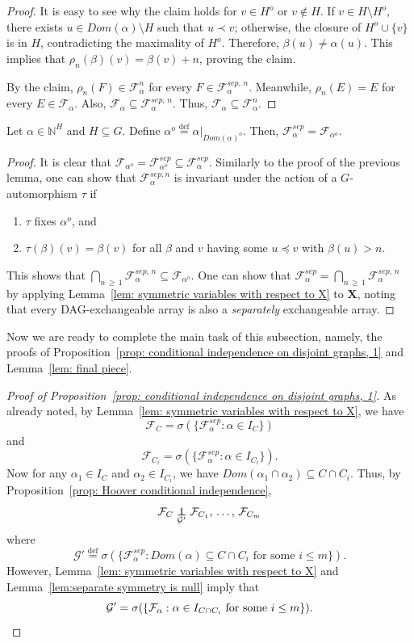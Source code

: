\documentclass[AHL,Unicode,longabstracts,published]{cedram}
\newcommand{\independent}{\protect\mathpalette{\protect\independenT}{\perp}}\def\independenT#1#2{\mathrel{\rlap{$#1#2$}\mkern2mu{#1#2}}}
\newcommand{\alf}{\alpha}%
\newcommand*\bb{\beta}
\newcommand*{\defeq}{\stackrel{\mathrm{def}}{=}}
\newcommand*{\sep}{\mathit{sep}}
\newcommand*\dom{\mathit{Dom}}
\newcommand*\N{\mathbb{N}}
\newcommand*\FF{\mathcal{F}}
\newcommand*\GG{\mathcal{G}}
\newcommand*\bX{\mathbf{X}}
\newcommand*\N{\mathbb{N}}
\begin{document}
\begin{proof}
It is easy to see why the claim holds for $v \in H^o$ or $v \notin H$. If $v \in H \setminus H^o$, there exists $u \in \dom(\alf)\setminus H$ such that $u \prec v$; otherwise, the closure of $H^o \cup \{v\}$ is in $H$, contradicting the maximality of $H^o$. Therefore, $\bb(u) \neq \alf(u)$. This implies that $\rho_n(\bb)(v)=\bb(v)+n$, proving the claim.

By the claim, $\rho_n (F) \in \FF_\alf^n$ for every $F \in \mathcal{F}_\alf^{\sep,\,n}$. Meanwhile, $\rho_n(E)=E$ for every $E \in \FF_\alf $. Also, $\FF_\alf \subseteq \mathcal{F}_\alf^{\sep,\,n}$. Thus, $\FF_\alf \subseteq \FF_\alf^n$.
\end{proof}



\begin{lemm}\label{lem:separate symmetry is null}
Let $\alf \in \N^H$ and $H \subseteq G$.
Define $\alf^o
\defeq\alf|_{\dom(\alf)^o}$. Then, $\FF_\alf^{\sep}=\FF_{\alf^o}$.
\end{lemm}

\begin{proof}
It is clear that $\FF_{\alf^o}=\FF_{\alf^o}^{\sep} \subseteq \FF_\alf^{\sep}$. Similarly to the proof of the previous lemma, one can show that $\mathcal{F}_\alf^{\sep,n}$ is invariant under the action of a $G$-automorphism $\tau$ if
\begin{enumerate}
\item $\tau$ fixes $\alf^o$, and
\item $\tau(\bb)(v)=\bb(v)$ for all $\bb$ and $v$ having some $u \preceq v$ with $\bb(u)>n$.
\end{enumerate}
This shows that $\bigcap_{n\,\geq\,1} \mathcal{F}_\alf^{\sep,\,n} \subseteq \FF_{\alf^o}$. One can show that $\FF_\alf^{\sep} = \bigcap_{n\,\geq\,1} \mathcal{F}_\alf^{\sep,\,n}$ by applying Lemma~\ref{lem: symmetric variables with respect to X} to $\bX$, noting that every DAG-exchangeable array is also a \emph{separately} exchangeable array.
\end{proof}

Now we are ready to complete the main task of this subsection, namely, the proofs of Proposition~\ref{prop: conditional independence on disjoint graphs, 1} and Lemma~\ref{lem: final piece}.

\begin{proof}[Proof of Proposition~\ref{prop: conditional independence on disjoint graphs, 1}]
As already noted, by Lemma~\ref{lem: symmetric variables with respect to X}, we have
\[
\FF_C=\sigma(\{\FF_\alf^{\sep}: \alf \in I_C\})
\]
and
\[
\FF_{C_i}=\sigma(\{\FF_\alf^{\sep}: \alf \in I_{C_i}\}).
\]
Now for any $\alf_1 \in I_C$ and $\alf_2 \in I_{C_i}$, we have $\dom(\alf_1 \cap \alf_2) \subseteq C \cap C_i$. Thus, by Proposition~\ref{prop: Hoover conditional independence},
\[
\FF_C \underset{\GG'}{\independent} \FF_{C_1},\,\ldots,\, \FF_{C_m}
\]
where
\[
\GG'
\defeq\sigma(\{\FF_\alf^{\sep}: \dom(\alf) \subseteq C \cap C_i \text{ for some } i \leq m \}).
\]
However, Lemma~\ref{lem: symmetric variables with respect to X} and Lemma~\ref{lem:separate symmetry is null} imply that
\[
\GG' = \sigma(\{\FF_\alf : \alf \in I_{C \cap C_i} \text{ for some } i \leq m\}).\qedhere
\]
\end{proof}
\end{document}
